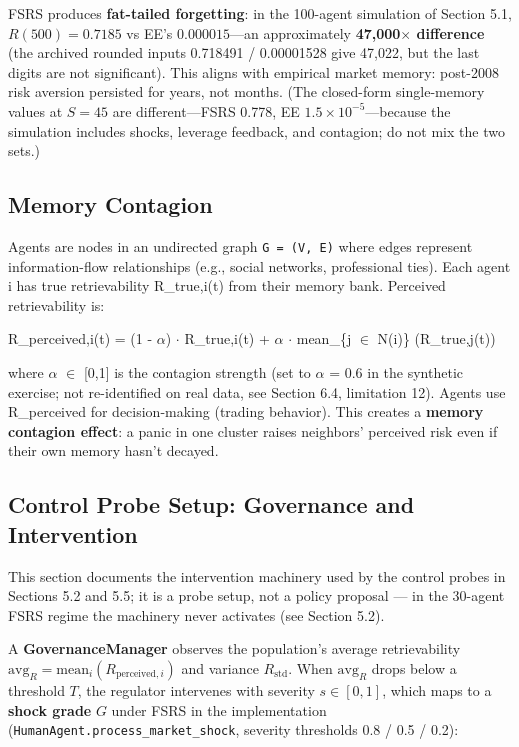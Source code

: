 \documentclass[11pt]{article}
\begin{document}
FSRS produces \textbf{fat-tailed forgetting}: in the 100-agent simulation of Section 5.1, $R(500) = 0.7185$ vs EE's $0.000015$---an approximately \textbf{47,000$\times$ difference} (the archived rounded inputs 0.718491 / 0.00001528 give 47,022, but the last digits are not significant). This aligns with empirical market memory: post-2008 risk aversion persisted for years, not months. (The closed-form single-memory values at $S=45$ are different---FSRS 0.778, EE $1.5 \times 10^{-5}$---because the simulation includes shocks, leverage feedback, and contagion; do not mix the two sets.)

\subsection{Memory Contagion}
Agents are nodes in an undirected graph \texttt{G = (V, E)} where edges represent information-flow relationships (e.g., social networks, professional ties). Each agent i has true retrievability R\_true,i(t) from their memory bank. Perceived retrievability is:

R\_perceived,i(t) = (1 - $\alpha$) $\cdot$ R\_true,i(t) + $\alpha$ $\cdot$ mean\_\{j $\in$ N(i)\} (R\_true,j(t))

where $\alpha$ $\in$ [0,1] is the contagion strength (set to $\alpha$ = 0.6 in the synthetic exercise; not re-identified on real data, see Section 6.4, limitation 12). Agents use R\_perceived for decision-making (trading behavior). This creates a \textbf{memory contagion effect}: a panic in one cluster raises neighbors' perceived risk even if their own memory hasn't decayed.

\subsection{Control Probe Setup: Governance and Intervention}
This section documents the intervention machinery used by the control probes in Sections 5.2 and 5.5; it is a probe setup, not a policy proposal --- in the 30-agent FSRS regime the machinery never activates (see Section 5.2).

A \textbf{GovernanceManager} observes the population's average retrievability $\text{avg}_R = \text{mean}_i(R_{\text{perceived},i})$ and variance $R_{\text{std}}$. When $\text{avg}_R$ drops below a threshold $T$, the regulator intervenes with severity $s \in [0,1]$, which maps to a \textbf{shock grade} $G$ under FSRS in the implementation (\texttt{HumanAgent.process\_market\_shock}, severity thresholds 0.8 / 0.5 / 0.2):
\end{document}
